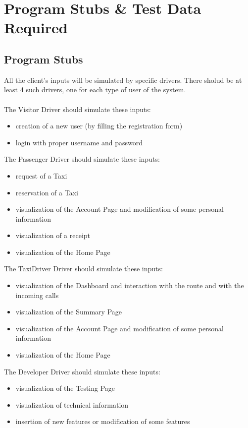 \chapter{Program Stubs \& Test Data Required} \label{chap5}

\section{Program Stubs}
All the client's inputs will be simulated by specific drivers. There sholud be at least 4 such drivers, one for each type of user of the system.\\ \\
\noindent The Visitor Driver should simulate these inputs:
\begin{itemize}
	\item creation of a new user (by filling the registration form)
	\item login with proper username and password\\
\end{itemize}

\noindent The Passenger Driver should simulate these inputs:
\begin{itemize}
	\item request of a Taxi
	\item reservation of a Taxi
	\item visualization of the Account Page and modification of some personal information
	\item visualization of a receipt
	\item visualization of the Home Page\\
\end{itemize}

\noindent The TaxiDriver Driver should simulate these inputs:
\begin{itemize}
	\item visualization of the Dashboard and interaction with the route and with the incoming calls
	\item visualization of the Summary Page
	\item visualization of the Account Page and modification of some personal information
	\item visualization of the Home Page\\
\end{itemize}

\noindent The Developer Driver should simulate these inputs:
\begin{itemize}
	\item visualization of the Testing Page
	\item visualization of technical information
	\item insertion of new features or modification of some features
\end{itemize}

